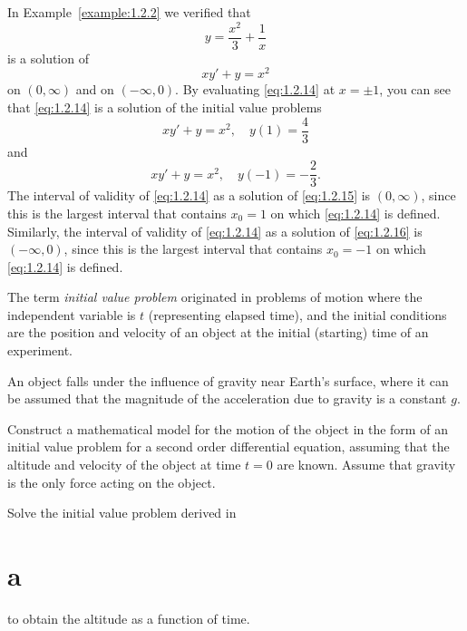 \begin{example}
  \label{example:1.2.7} \rm In Example~\ref{example:1.2.2} we verified that
  \begin{equation}
    \label{eq:1.2.14}y=\frac{x^{2}}{3}+\frac{1}{x}
  \end{equation}
  is a solution of
  \[
    xy'+y=x^{2}
  \]
  on $(0,\infty)$ and on $(-\infty,0)$. By evaluating \eqref{eq:1.2.14} at $x=\pm1$, you can see
  that \eqref{eq:1.2.14} is a solution of the initial value problems
  \begin{equation}
    \label{eq:1.2.15}xy'+y=x^{2},\quad y(1)=\frac{4}{3}
  \end{equation}
  and
  \begin{equation}
    \label{eq:1.2.16}xy'+y=x^{2},\quad y(-1)=-\frac{2}{3}.
  \end{equation}
  The interval of validity of \eqref{eq:1.2.14} as a solution of \eqref{eq:1.2.15} is $(0,\infty)$,
  since this is the largest interval that contains $x_{0}=1$ on which \eqref{eq:1.2.14} is defined.
  Similarly, the interval of validity of \eqref{eq:1.2.14} as a solution of \eqref{eq:1.2.16} is
  $(-\infty,0)$, since this is the largest interval that contains $x_{0}=-1$ on which
  \eqref{eq:1.2.14} is defined.
\end{example}


\noindent
The term {\color{blue}\it initial value problem} originated in problems of motion where the
independent variable is $t$ (representing elapsed time), and the initial conditions are the position
and velocity of an object at the initial (starting) time of an experiment.

\begin{example}
  \label{example:1.2.8} \rm An object falls under the influence of gravity near Earth's surface,
  where it can be assumed that the magnitude of the acceleration due to gravity is a constant $g$.
  \begin{alist}
    \item %
    Construct a mathematical model for the motion of the object in the form of an initial value
    problem for a second order differential equation, assuming that the altitude and velocity of the
    object at time $t=0$ are known. Assume that gravity is the only force acting on the object.

    \item %
    Solve the initial value problem derived in \part{a} to obtain the altitude as a function of
    time.
  \end{alist}
\end{example}

